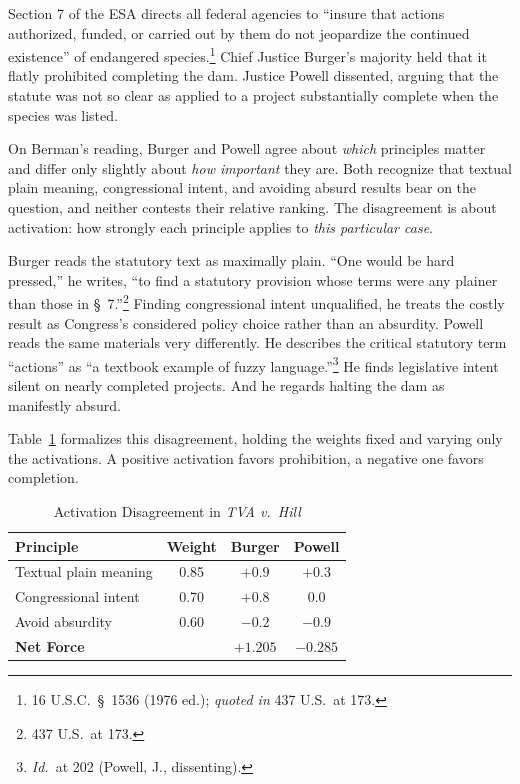 Section 7 of the ESA directs all federal agencies to ``insure that actions
authorized, funded, or carried out by them do not jeopardize the continued
existence'' of endangered species.\footnote{16 U.S.C.\ \S~1536 (1976 ed.);
\textit{quoted in} 437 U.S.\ at 173.} Chief Justice Burger's majority held
that it flatly prohibited completing the dam. Justice
Powell dissented, arguing that the statute was not so clear as applied to
a project substantially complete when the species was listed.

On Berman's reading, Burger and Powell agree about \textit{which}
principles matter and differ only slightly about \textit{how important}
they are. Both
recognize that textual plain meaning, congressional intent, and avoiding
absurd results bear on the question, and neither contests their relative
ranking. The disagreement is about activation: how strongly each
principle applies to \textit{this particular case}.

Burger reads the statutory text as maximally plain. ``One would be hard
pressed,'' he writes, ``to find a statutory provision whose terms were any
plainer than those in \S~7.''\footnote{437 U.S.\ at 173.} Finding congressional intent unqualified, he treats the costly result as
Congress's considered policy choice rather than an absurdity. Powell
reads the same materials very differently. He describes the critical
statutory term ``actions'' as ``a textbook example of fuzzy
language.''\footnote{\textit{Id.}\ at 202 (Powell, J., dissenting).} He
finds legislative intent silent on nearly completed projects. And he
regards halting the dam as manifestly absurd.

Table~\ref{tab:tvah} formalizes this disagreement, holding the weights fixed
and varying only the activations. A positive activation favors prohibition,
a negative one favors completion.

\begin{table}[ht]
\centering
\caption{Activation Disagreement in \textit{TVA v.\ Hill}}
\label{tab:tvah}
\begin{tabular}{lccc}
\toprule
\textbf{Principle} & \textbf{Weight} & \textbf{Burger} & \textbf{Powell} \\
\midrule
Textual plain meaning & 0.85 & $+0.9$ & $+0.3$ \\
Congressional intent & 0.70 & $+0.8$ & $0.0$ \\
Avoid absurdity & 0.60 & $-0.2$ & $-0.9$ \\
\midrule
\textbf{Net Force} & & $\mathbf{+1.205}$ & $\mathbf{-0.285}$ \\
\bottomrule
\end{tabular}
\end{table}

